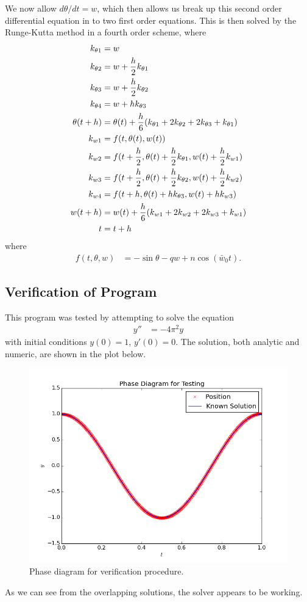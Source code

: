 \documentclass[10pt,letter]{article}
\begin{document}
We now allow $d\theta/dt = w$, which then allows us break up this second order differential equation in to two first order equations. This is then solved by the Runge-Kutta method in a fourth order scheme, where
\begin{align}
k_{\theta 1} &= w \notag\\
k_{\theta 2} &= w + \frac{h}{2}k_{\theta 1} \notag \\
k_{\theta 3} &= w + \frac{h}{2}k_{\theta 2} \notag \\
k_{\theta 4} &= w + hk_{\theta 3} \notag \\
\theta(t+h) &= \theta(t) + \frac{h}{6}(k_{\theta 1} + 2k_{\theta 2} + 2k_{\theta 3} +k_{\theta 1}) \notag \\
k_{w 1} &= f(t, \theta(t), w(t)) \notag \\
k_{w 2} &= f(t+ \frac{h}{2}, \theta(t)+ \frac{h}{2}k_{\theta 1}, w(t)+ \frac{h}{2}k_{w 1}) \notag \\
k_{w 3} &= f(t+ \frac{h}{2}, \theta(t)+ \frac{h}{2}k_{\theta 2}, w(t)+ \frac{h}{2}k_{w 2}) \notag \\
k_{w 4} &= f(t+ h, \theta(t)+ hk_{\theta 3}, w(t)+hk_{w3}) \notag \\
w(t+h) &= w(t) + \frac{h}{6}(k_{w 1} + 2k_{w 2} + 2k_{w 3} +k_{w 1}) \notag \\
t&=t+h \notag
\end{align}
where
\begin{align}
 f(t, \theta, w)  &= -\sin{\theta}-qw+n\cos{(\bar{w}_0t)}.
\end{align}


\subsection{Verification of Program}

This program was tested by attempting to solve the equation
\begin{align}
y'' &= -4\pi^2y
\end{align}
with initial conditions $y(0)=1$, $y'(0)=0$. The solution, both analytic and numeric, are shown in the plot below.
\begin{figure}[h]
  \centering
    \includegraphics[width=.5\textwidth]{homework6_problem1_plot10}
  \caption{Phase diagram for verification procedure.}
\end{figure}
As we can see from the overlapping solutions, the solver appears to be working.
\end{document}
